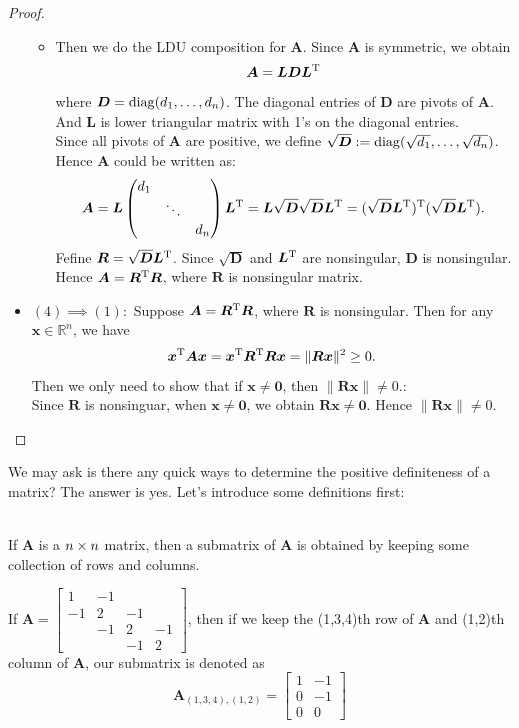\begin{proof}
\begin{itemize}
\begin{itemize}
\item
Then we do the LDU composition for $\bm A$. Since $\bm A$ is symmetric, we obtain
\[
\bm A=\bm L\bm D\bm L^{\mathrm T}
\]
where $\bm D=\operatorname{diag}(d_1,\dots,d_n)$. The diagonal entries of $\bm D$ are pivots of $\bm A$. And $\bm L$ is lower triangular matrix with 1's on the diagonal entries.\\
Since all pivots of $\bm A$ are positive, we define $\sqrt{\bm D}:=\operatorname{diag}(\sqrt{d_1},\dots,\sqrt{d_n})$.\\
Hence $\bm A$ could be written as:
\[
\bm A=\bm L\begin{pmatrix}
d_1&&\\&\ddots&\\&&d_n
\end{pmatrix}\bm L^{\mathrm T}=\bm L\sqrt{\bm D}\sqrt{\bm D}\bm L^{\mathrm T}=(\sqrt{\bm D}\bm L^{\mathrm T})^{\mathrm T}(\sqrt{\bm D}\bm L^{\mathrm T}).
\]
Fefine $\bm R=\sqrt{\bm D}\bm L^{\mathrm T}$. Since $\sqrt{\bm D}$ and $\bm L^{\mathrm T}$ are nonsingular, $\bm D$ is nonsingular. \\Hence $\bm A=\bm R^{\mathrm T}\bm R$, where $\bm R$ is nonsingular matrix.
\end{itemize}
\item
$(4)\implies(1): $
Suppose $\bm A=\bm R^{\mathrm T}\bm R$, where $\bm R$ is nonsingular. Then for any $\bm x\in\mathbb{R}^{n}$, we have
\[
\bm x^{\mathrm T}\bm A\bm x=\bm x^{\mathrm T}\bm R^{\mathrm T}\bm R\bm x=\|\bm{Rx}\|^2\ge0.
\]
Then we only need to show that if $\bm x\ne\bm0$, then $\|\bm{Rx}\|\ne0.$:\\
Since $\bm R$ is nonsinguar, when $\bm x\ne\bm 0$, we obtain $\bm{Rx}\ne\bm0.$ Hence $\|\bm{Rx}\|\ne0.$
\end{itemize}
\end{proof}
We may ask is there any quick ways to determine the positive definiteness of a matrix? The answer is yes. Let's introduce some definitions first:
\enlargethispage{1cm}
\begin{definition}[Submatrix]\qquad\\
If $\bm A$ is a $n\times n$ matrix, then a submatrix of $\bm A$ is obtained by keeping some collection of rows and columns.
\end{definition}
\begin{example}
If $\bm A=\begin{bmatrix}
1&-1&&\\-1&2&-1&\\&-1&2&-1\\&&-1&2
\end{bmatrix}$, then if we keep the (1,3,4)th row of $\bm A$ and (1,2)th column of $\bm A$, our submatrix is denoted as
\[
\bm A_{(1,3,4),(1,2)}=\begin{bmatrix}
1&-1\\0&-1\\0&0
\end{bmatrix}
\]
\end{example}
